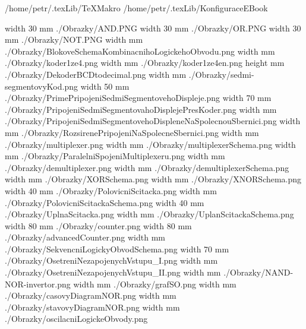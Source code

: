 
\def\addr{/home/petr/.texLib/}

 \addr TeXMakro
\setAddress{\addr}
 \addr KonfiguraceEBook


\pdfximage width 30 mm {./Obrazky/AND.PNG}
\pdfximage width 30 mm {./Obrazky/OR.PNG}
\pdfximage width 30 mm {./Obrazky/NOT.PNG}
\pdfximage width \the\SirkaOdstavce mm {./Obrazky/BlokoveSchemaKombinacnihoLogickehoObvodu.png}
\pdfximage width \the\SirkaOdstavce mm {./Obrazky/koder1ze4.png}
\pdfximage width \the\SirkaOdstavce mm {./Obrazky/koder1ze4en.png}
\pdfximage height \the\SirkaOdstavce mm {./Obrazky/DekoderBCDtodecimal.png}
\pdfximage width \the\SirkaOdstavce mm {./Obrazky/sedmi-segmentovyKod.png}
\pdfximage width 50 mm {./Obrazky/PrimePripojeniSedmiSegmentovehoDispleje.png}
\pdfximage width 70 mm {./Obrazky/PripojeniSedmiSegmentovahoDisplejePresKoder.png}
\pdfximage width \the\SirkaOdstavce mm {./Obrazky/PripojeniSedmiSegmentovehoDispleneNaSpolecnouSbernici.png}
\pdfximage width \the\SirkaOdstavce mm {./Obrazky/RozsirenePripojeniNaSpolecneSbernici.png}
\pdfximage width \the\SirkaOdstavce mm {./Obrazky/multiplexer.png}
\pdfximage width \the\SirkaOdstavce mm {./Obrazky/multiplexerSchema.png}
\pdfximage width \the\SirkaOdstavce mm {./Obrazky/ParalelniSpojeniMultiplexeru.png}
\pdfximage width \the\SirkaOdstavce mm {./Obrazky/demultiplexer.png}
\pdfximage width \the\SirkaOdstavce mm {./Obrazky/demultiplexerSchema.png}
\pdfximage width \the\SirkaOdstavce mm {./Obrazky/XORSchema.png}
\pdfximage width \the\SirkaOdstavce mm {./Obrazky/XNORSchema.png}
\pdfximage width 40 mm {./Obrazky/PolovicniScitacka.png}
\pdfximage width \the\SirkaOdstavce mm {./Obrazky/PolovicniScitackaSchema.png}
\pdfximage width 40 mm {./Obrazky/UplnaScitacka.png}
\pdfximage width \the\SirkaOdstavce mm {./Obrazky/UplanScitackaSchema.png}
\pdfximage width 80 mm {./Obrazky/counter.png}
\pdfximage width 80 mm {./Obrazky/advancedCounter.png}
\pdfximage width \the\SirkaOdstavce mm {./Obrazky/SekvencniLogickyObvodSchema.png}
\pdfximage width 70 mm {./Obrazky/OsetreniNezapojenychVstupu_I.png}
\pdfximage width \the\SirkaOdstavce mm {./Obrazky/OsetreniNezapojenychVstupu_II.png}
\pdfximage width \the\SirkaOdstavce mm {./Obrazky/NAND-NOR-invertor.png}
\pdfximage width \the\SirkaOdstavce mm {./Obrazky/grafSO.png}
\pdfximage width \the\SirkaOdstavce mm {./Obrazky/casovyDiagramNOR.png}
\pdfximage width \the\SirkaOdstavce mm {./Obrazky/stavovyDiagramNOR.png}
\pdfximage width \the\SirkaOdstavce mm {./Obrazky/oscilacniLogickeObvody.png}

